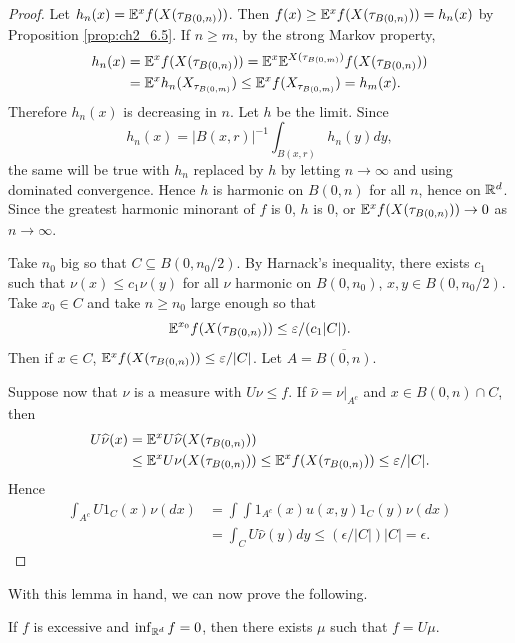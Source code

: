 \begin{proof}
Let $h_n(x) = \mathbb{E}^xf(X(\tau_{B(0,n)}))$. Then $f(x) \geq \mathbb{E}^xf(X(\tau_{B(0,n)})) = h_n(x)$ by Proposition \ref{prop:ch2_6.5}. If $n \geq m$, by the strong Markov property,
\begin{align*}
    h_n(x) &= \mathbb{E}^xf(X(\tau_{B(0,n)})) = \mathbb{E}^x\mathbb{E}^{X(\tau_{B(0,m)})}f(X(\tau_{B(0,n)})) \\
    &= \mathbb{E}^xh_n(X_{\tau_{B(0,m)}}) \leq \mathbb{E}^xf(X_{\tau_{B(0,m)}}) = h_m(x).
\end{align*}
Therefore $h_n(x)$ is decreasing in $n$. Let $h$ be the limit. Since
\[
    h_n(x) = |B(x,r)|^{-1}\int_{B(x,r)} h_n(y)dy,
\]
the same will be true with $h_n$ replaced by $h$ by letting $n \to \infty$ and using dominated convergence. Hence $h$ is harmonic on $B(0,n)$ for all $n$, hence on $\mathbb{R}^d$. Since the greatest harmonic minorant of $f$ is $0$, $h$ is $0$, or $\mathbb{E}^xf(X(\tau_{B(0,n)})) \to 0$ as $n \to \infty$.

Take $n_0$ big so that $C \subseteq B(0,n_0/2)$. By Harnack's inequality, there exists $c_1$ such that $\nu(x) \leq c_1\nu(y)$ for all $\nu$ harmonic on $B(0,n_0)$, $x,y \in B(0,n_0/2)$. Take $x_0 \in C$ and take $n \geq n_0$ large enough so that
\[
    \mathbb{E}^{x_0}f(X(\tau_{B(0,n)})) \leq \varepsilon/(c_1|C|).
\]
Then if $x \in C$, $\mathbb{E}^xf(X(\tau_{B(0,n)})) \leq \varepsilon/|C|$. Let $A = \overline{B(0,n)}$.

Suppose now that $\nu$ is a measure with $U\nu \leq f$. If $\widehat{\nu} = \nu|_{A^c}$ and $x \in B(0,n) \cap C$, then
\begin{align*}
    U\widehat{\nu}(x) &= \mathbb{E}^xU\widehat{\nu}(X(\tau_{B(0,n)})) \\
    &\leq \mathbb{E}^xU\nu(X(\tau_{B(0,n)})) \leq \mathbb{E}^xf(X(\tau_{B(0,n)})) \leq \varepsilon/|C|.
\end{align*}
Hence
\begin{align*}
    \int_{A^c} U1_C(x)\nu(dx) &= \int\int 1_{A^c}(x) u(x,y)1_C(y)\nu(dx) \\
    &= \int_C U\widehat{\nu}(y)dy \leq (\epsilon/|C|)|C| = \epsilon.
\end{align*}
\end{proof}

With this lemma in hand, we can now prove the following.


\begin{theorem}\label{thm:ch2_6.14}
If $f$ is excessive and $\inf_{\mathbb{R}^d} f = 0$, then there exists $\mu$ such that $f = U\mu$.
\end{theorem}

